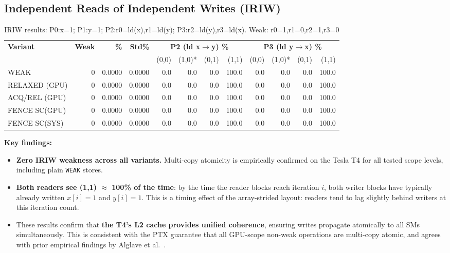 \documentclass[a4paper]{article}
\begin{document}
\subsection{Independent Reads of Independent Writes (IRIW)}

\begin{table}[H]
\centering
\small
\caption{IRIW results: P0:x=1; P1:y=1; P2:r0=ld(x),r1=ld(y); P3:r2=ld(y),r3=ld(x). Weak: r0=1,r1=0,r2=1,r3=0}
\label{tab:iriw-results}
\begin{tabular}{l|r r r | r r r r | r r r r}
\toprule
\textbf{Variant} & \textbf{Weak} & \textbf{\%} & \textbf{Std\%}
  & \multicolumn{4}{c|}{\textbf{P2 (ld x$\to$y) \%}}
  & \multicolumn{4}{c}{\textbf{P3 (ld y$\to$x) \%}} \\
& & & & (0,0) & (1,0)* & (0,1) & (1,1) & (0,0) & (1,0)* & (0,1) & (1,1) \\
\midrule
WEAK         & 0 & 0.0000 & 0.0000 & 0.0 & 0.0 & 0.0 & 100.0 & 0.0 & 0.0 & 0.0 & 100.0 \\
RELAXED (GPU)& 0 & 0.0000 & 0.0000 & 0.0 & 0.0 & 0.0 & 100.0 & 0.0 & 0.0 & 0.0 & 100.0 \\
ACQ/REL (GPU)& 0 & 0.0000 & 0.0000 & 0.0 & 0.0 & 0.0 & 100.0 & 0.0 & 0.0 & 0.0 & 100.0 \\
FENCE SC(GPU)& 0 & 0.0000 & 0.0000 & 0.0 & 0.0 & 0.0 & 100.0 & 0.0 & 0.0 & 0.0 & 100.0 \\
FENCE SC(SYS)& 0 & 0.0000 & 0.0000 & 0.0 & 0.0 & 0.0 & 100.0 & 0.0 & 0.0 & 0.0 & 100.0 \\
\bottomrule
\end{tabular}
\end{table}

\textbf{Key findings:}
\begin{itemize}
  \item \textbf{Zero IRIW weakness across all variants.}
    Multi-copy atomicity is empirically confirmed on the Tesla T4 for all tested scope levels, including plain \texttt{WEAK} stores.
  \item \textbf{Both readers see (1,1) $\approx$ 100\% of the time}: by the time the reader blocks reach iteration $i$, both writer blocks have typically already written $x[i]=1$ and $y[i]=1$. This is a timing effect of the array-strided layout: readers tend to lag slightly behind writers at this iteration count.
  \item These results confirm that \textbf{the T4's L2 cache provides unified coherence}, ensuring writes propagate atomically to all SMs simultaneously. This is consistent with the PTX guarantee that all GPU-scope non-weak operations are multi-copy atomic, and agrees with prior empirical findings by Alglave et al.\ \cite{Alglave2015GPU}.
\end{itemize}
\end{document}
